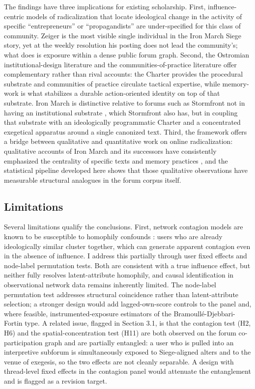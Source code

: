 \documentclass[bibtex,autowc,nonblind]{apsr_submission}
\begin{document}
The findings have three implications for existing scholarship. First, influence-centric models of radicalization that locate ideological change in the activity of specific ``entrepreneurs'' or ``propagandists'' are under-specified for this class of community. Zeiger is the most visible single individual in the Iron March Siege story, yet at the weekly resolution his posting does not lead the community's; what does is exposure within a dense public forum graph. Second, the Ostromian institutional-design literature \citep{ostrom1990governing, frey2019_part, schneider2022} and the communities-of-practice literature \citep{kenney2020community, furstenberg2024decentralized, lee2022} offer complementary rather than rival accounts: the Charter provides the procedural substrate and communities of practice circulate tactical expertise, while memory-work is what stabilizes a durable action-oriented identity on top of that substrate. Iron March is distinctive relative to forums such as Stormfront not in having an institutional substrate \citep{caren2012social, bowman2009}, which Stormfront also has, but in coupling that substrate with an ideologically programmatic Charter and a concentrated exegetical apparatus around a single canonized text. Third, the framework offers a bridge between qualitative and quantitative work on online radicalization: qualitative accounts of Iron March and its successors have consistently emphasized the centrality of specific texts and memory practices \citep{upchurch, johnson2023siege, sunshine2024neo, ware2019siege}, and the statistical pipeline developed here shows that those qualitative observations have measurable structural analogues in the forum corpus itself.

\subsection{Limitations}

Several limitations qualify the conclusions. First, network contagion models are known to be susceptible to homophily confounds \citep{aral2009distinguishing, shalizi2011homophily}: users who are already ideologically similar cluster together, which can generate apparent contagion even in the absence of influence. I address this partially through user fixed effects and node-label permutation tests. Both are consistent with a true influence effect, but neither fully resolves latent-attribute homophily, and causal identification in observational network data remains inherently limited. The node-label permutation test addresses structural coincidence rather than latent-attribute selection; a stronger design would add lagged-own-score controls to the panel and, where feasible, instrumented-exposure estimators of the Bramoull\'e-Djebbari-Fortin type. A related issue, flagged in Section 3.1, is that the contagion test (H2, H6) and the spatial-concentration test (H11) are both observed on the forum co-participation graph and are partially entangled: a user who is pulled into an interpretive subforum is simultaneously exposed to Siege-aligned alters and to the venue of exegesis, so the two effects are not cleanly separable. A design with thread-level fixed effects in the contagion panel would attenuate the entanglement and is flagged as a revision target.
\end{document}
